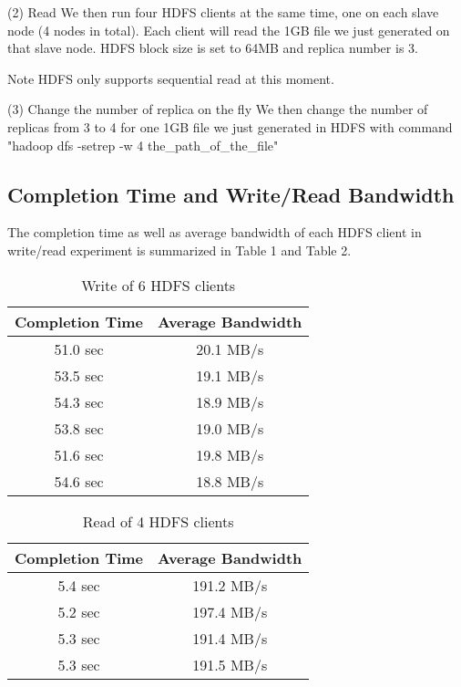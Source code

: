 (2) Read
We then run four HDFS clients at the same time, one on each slave node (4 nodes in total). Each client will read the 1GB file we just generated on that slave node. HDFS block size is set to 64MB and replica number is 3.

Note HDFS only supports sequential read at this moment.

(3) Change the number of replica on the fly
We then change the number of replicas from 3 to 4 for one 1GB file we just generated in HDFS with command "hadoop dfs -setrep -w 4 the\_path\_of\_the\_file"

\subsection{\bf Completion Time and Write/Read Bandwidth}

The completion time as well as average bandwidth of each HDFS client in write/read experiment is summarized in Table 1 and Table 2.

\begin{table}[!thb]
\centering
\begin{tabular}{|c|c|} \hline
Completion Time & Average Bandwidth\\ \hline
51.0 sec & 20.1 MB/s\\ \hline
53.5 sec & 19.1 MB/s\\ \hline
54.3 sec & 18.9 MB/s\\ \hline
53.8 sec & 19.0 MB/s\\ \hline
51.6 sec & 19.8 MB/s\\ \hline
54.6 sec & 18.8 MB/s\\ \hline
\end{tabular}\label{t1}
\caption{Write of 6 HDFS clients}
\end{table}

\begin{table}[!thb]
\centering
\begin{tabular}{|c|c|} \hline
Completion Time & Average Bandwidth\\ \hline
5.4 sec & 191.2 MB/s\\ \hline
5.2 sec & 197.4 MB/s\\ \hline
5.3 sec & 191.4 MB/s\\ \hline
5.3 sec & 191.5 MB/s\\ \hline
\end{tabular}\label{t1}
\caption{Read of 4 HDFS clients}
\end{table}



